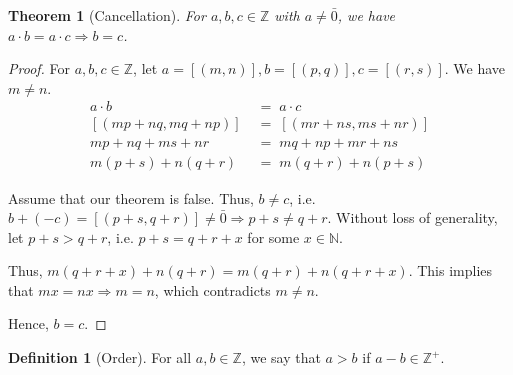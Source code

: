\documentclass[10pt]{article}
\newtheorem{theorem}{Theorem}[section]
\theoremstyle{definition}
\newtheorem*{definition}{Definition}
\theoremstyle{remark}
\begin{document}
        \begin{theorem}[Cancellation]
                For $a, b, c \in \mathbb{Z}$ with $a\neq \bar{0}$, we have $a\cdot b = a\cdot c
                \Rightarrow b = c$.
        \end{theorem}
        \begin{proof}
                For $a,b,c \in \mathbb{Z}$, let $a = [(m, n)], b = [(p, q)], c = [(r, s)]$.
                We have $m \neq n$.
                \begin{align*}
                a\cdot b \;&=\; a\cdot c\\
                [(mp + nq, mq + np)] \;&=\; [(mr + ns, ms + nr)] \\
                mp + nq + ms + nr \;&=\; mq + np + mr + ns \\
                m(p + s) + n (q + r) \;&=\; m(q + r) + n(p + s)
                \end{align*}
                
                Assume that our theorem is false.
                Thus, $b\neq c$, i.e. $b + (-c) = [(p + s, q + r)] \neq \bar{0} \Rightarrow p + s \neq q + r$.
                Without loss of generality, let $p + s > q + r$, i.e. $p + s = q + r + x$ for some $x \in \mathbb{N}$.

                Thus, $m(q + r + x) + n(q + r) = m(q + r) + n(q + r + x)$. This implies that
                $mx = nx \Rightarrow m = n$, which contradicts $m \neq n$.

                Hence, $b = c$.
        \end{proof}
        
        \begin{definition}[Order]
                For all $a, b \in \mathbb{Z}$, we say that $a > b$ if $a - b \in \mathbb{Z}^+$.
        \end{definition}
        
\end{document}
